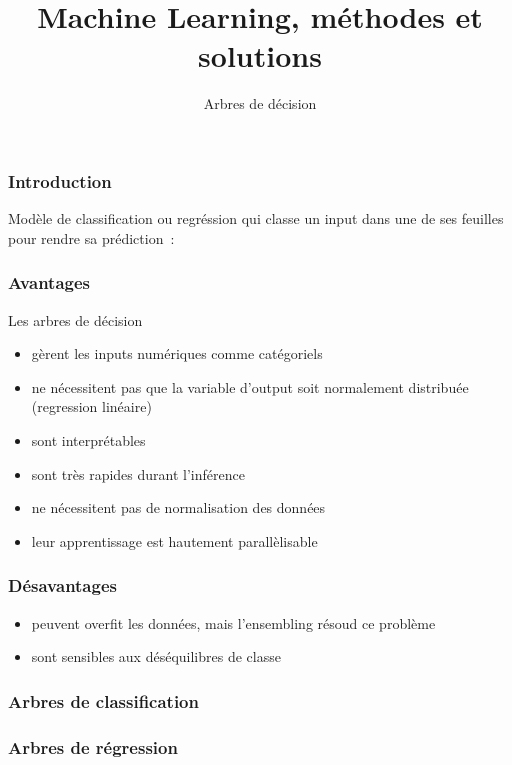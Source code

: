 \documentclass{formation}
\title{Machine Learning, méthodes et solutions}
\subtitle{Arbres de décision}
\begin{document}
\maketitle

\begin{frame}
  \frametitle{Introduction}
  Modèle de classification ou regréssion qui classe un input dans une
  de ses feuilles pour rendre sa prédiction :
\end{frame}

\begin{frame}
  \frametitle{Avantages}
  Les arbres de décision
  \begin{itemize}[<+->]
  \item gèrent les inputs numériques comme catégoriels
  \item ne nécessitent pas que la variable d'output soit normalement
    distribuée (regression linéaire)
  \item sont interprétables
  \item sont très rapides durant l'inférence
  \item ne nécessitent pas de normalisation des données
  \item leur apprentissage est hautement parallèlisable
  \end{itemize}
\end{frame}

\begin{frame}
  \frametitle{Désavantages}
  \begin{itemize}[<+->]
  \item peuvent overfit les données, mais l'ensembling résoud ce
    problème
  \item sont sensibles aux déséquilibres de classe
  \end{itemize}
\end{frame}

\begin{frame}
  \frametitle{Arbres de classification}
\end{frame}

\begin{frame}
  \frametitle{Arbres de régression}
\end{frame}
\end{document}
